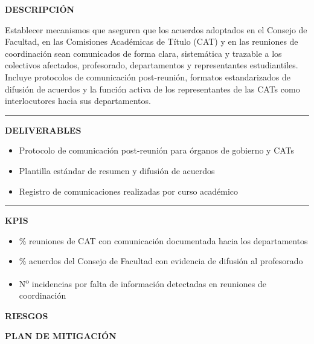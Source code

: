 \documentclass[11pt,a4paper]{scrreprt}
\newcommand{\fieldlabel}[1]{%
  {\footnotesize\sffamily\bfseries\color{mutedcolor}\MakeUppercase{#1}}\par\nopagebreak[4]
}
\newcommand{\fieldsep}{\vspace{3pt}\noindent\textcolor{bordercolor}{\rule{\linewidth}{0.4pt}}\vspace{3pt}\par}
\begin{document}
\begin{tcolorbox}[pabox={gobcolor}{PA3.3 \enspace\textbullet\enspace Transmisión efectiva de acuerdos de información institucional}]

\fieldlabel{Descripci\'on}
{\small Establecer mecanismos que aseguren que los acuerdos adoptados en el Consejo de Facultad, en las Comisiones Académicas de Título (CAT) y en las reuniones de coordinación sean comunicados de forma clara, sistemática y trazable a los colectivos afectados, profesorado, departamentos y representantes estudiantiles. Incluye protocolos de comunicación post-reunión, formatos estandarizados de difusión de acuerdos y la función activa de los representantes de las CATs como interlocutores hacia sus departamentos.}\par
\fieldsep
\fieldlabel{Deliverables}
{\small \begin{itemize}[noitemsep,topsep=2pt]
\item Protocolo de comunicación post-reunión para órganos de gobierno y CATs
\item Plantilla estándar de resumen y difusión de acuerdos
\item Registro de comunicaciones realizadas por curso académico
\end{itemize}}\par
\fieldsep
\fieldlabel{KPIs}
{\small \begin{itemize}[noitemsep,topsep=2pt]
\item \% reuniones de CAT con comunicación documentada hacia los departamentos
\item \% acuerdos del Consejo de Facultad con evidencia de difusión al profesorado
\item N\textsuperscript{o} incidencias por falta de información detectadas en reuniones de coordinación
\end{itemize}}\par
\end{tcolorbox}
\begin{tcolorbox}[riskbox]
{\footnotesize\sffamily\bfseries\color{red!50!black} RIESGOS}\par{}
\end{tcolorbox}
\begin{tcolorbox}[mitbox]
{\footnotesize\sffamily\bfseries\color{green!40!black} PLAN DE MITIGACI\'ON}\par{}
\end{tcolorbox}
\vspace{8pt}
\end{document}
